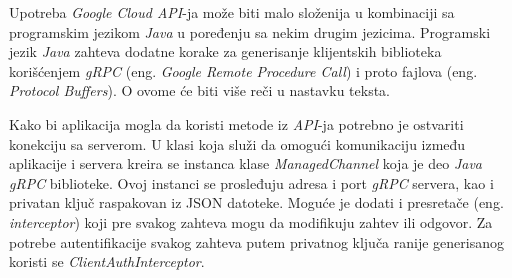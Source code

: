\documentclass[android.tex]{subfiles}
\begin{document}
Upotreba \textit{Google Cloud API}-ja može biti malo složenija u kombinaciji sa programskim jezikom \textit{Java} u poređenju sa nekim drugim jezicima. Programski jezik \textit{Java} zahteva dodatne korake za generisanje klijentskih biblioteka korišćenjem \textit{gRPC} (eng. \textit{Google Remote Procedure Call}) i proto fajlova (eng. \textit{Protocol Buffers}). O ovome će biti više reči u nastavku teksta.

Kako bi aplikacija mogla da koristi metode iz \textit{API}-ja potrebno je ostvariti konekciju sa serverom. U klasi koja služi da omogući komunikaciju između aplikacije i servera kreira se instanca klase \textit{ManagedChannel} koja je deo \textit{Java gRPC} biblioteke. Ovoj instanci se prosleđuju adresa i port \textit{gRPC} servera, kao i privatan ključ raspakovan iz JSON datoteke. Moguće je dodati i presretače (eng. \textit{interceptor}) koji pre svakog zahteva mogu da modifikuju zahtev ili odgovor. Za potrebe autentifikacije svakog zahteva putem privatnog ključa ranije generisanog koristi se \textit{ClientAuthInterceptor}.
\end{document}
